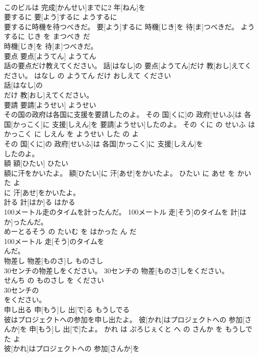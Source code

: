 \documentclass[8pt]{extreport}
\begin{document}
\begin{CJK}{UTF8}{min}
\\	このビルは 完成[かんせい]までに2 年[ねん]を
\\	要するに	要[よう]するに	ようするに	
\\	要するに時機を待つべきだ。	要[よう]するに 時機[じき]を 待[ま]つべきだ。	ようするに じき を まつべき だ	
\\	時機[じき]を 待[ま]つべきだ。			
\\	要点	要点[ようてん]	ようてん	
\\	話の要点だけ教えてください。	話[はなし]の 要点[ようてん]だけ 教[おし]えてください。	はなし の ようてん だけ おしえて ください	
\\	話[はなし]の
\\	だけ 教[おし]えてください。			
\\	要請	要請[ようせい]	ようせい	
\\	その国の政府は各国に支援を要請したのよ。	その 国[くに]の 政府[せいふ]は 各国[かっこく]に 支援[しえん]を 要請[ようせい]したのよ。	その くに の せいふ は かっこく に しえん を ようせい した の よ	
\\	その 国[くに]の 政府[せいふ]は 各国[かっこく]に 支援[しえん]を
\\	したのよ。			
\\	額	額[ひたい]	ひたい	
\\	額に汗をかいたよ。	額[ひたい]に 汗[あせ]をかいたよ。	ひたい に あせ を かいた よ	
\\	に 汗[あせ]をかいたよ。			
\\	計る	計[はか]る	はかる	
\\	100メートル走のタイムを計ったんだ。	100メートル 走[そう]のタイムを 計[はか]ったんだ。	
\\	めーとるそう の たいむ を はかった ん だ	
\\	100メートル 走[そう]のタイムを
\\	んだ。			
\\	物差し	物差[ものさ]し	ものさし	
\\	30センチの物差しをください。	30センチの 物差[ものさ]しをください。	
\\	せんち の ものさし を ください	
\\	30センチの
\\	をください。			
\\	申し出る	申[もう]し 出[で]る	もうしでる	
\\	彼はプロジェクトへの参加を申し出たよ。	彼[かれ]はプロジェクトへの 参加[さんか]を 申[もう]し 出[で]たよ。	かれ は ぷろじぇくと へ の さんか を もうしでた よ	
\\	彼[かれ]はプロジェクトへの 参加[さんか]を

\end{CJK}
\end{document}
